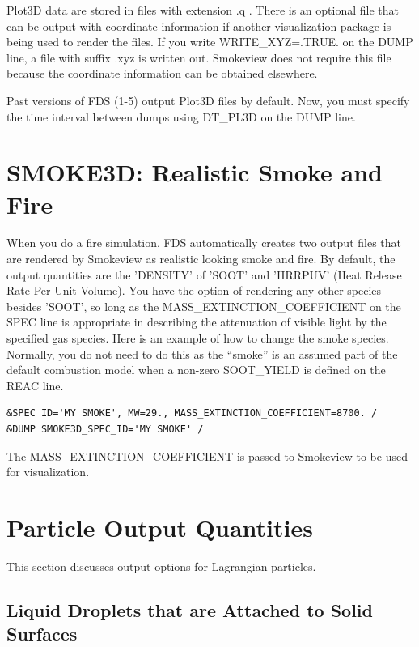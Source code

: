 \documentclass[11pt]{book}
\begin{document}
Plot3D data are stored in files with extension {\ct .q} . There is an optional file that can be output with coordinate information if another visualization package is being used to render the files. If you write {\ct WRITE\_XYZ=.TRUE.} on the {\ct DUMP} line, a file with suffix {\ct .xyz} is written out. Smokeview does not require this file because the coordinate information can be obtained elsewhere.

Past versions of FDS (1-5) output Plot3D files by default. Now, you must specify the time interval between dumps using {\ct DT\_PL3D} on the {\ct DUMP} line.



\section{SMOKE3D: Realistic Smoke and Fire}
\label{info:SMOKE3D}

When you do a fire simulation, FDS automatically creates two output files that are rendered by Smokeview as realistic looking smoke and fire. By default, the output quantities are the {\ct 'DENSITY'} of {\ct 'SOOT'} and {\ct 'HRRPUV'} (Heat Release Rate Per Unit Volume). You have the option of rendering any other species besides {\ct 'SOOT'}, so long as the {\ct MASS\_EXTINCTION\_COEFFICIENT} on the {\ct SPEC} line is appropriate in describing the attenuation of visible light by the specified gas species. Here is an example of how to change the smoke species. Normally, you do not need to do this as the ``smoke'' is an assumed part of the default combustion model when a non-zero {\ct SOOT\_YIELD} is defined on the {\ct REAC} line.
\begin{lstlisting}
&SPEC ID='MY SMOKE', MW=29., MASS_EXTINCTION_COEFFICIENT=8700. /
&DUMP SMOKE3D_SPEC_ID='MY SMOKE' /
\end{lstlisting}
The {\ct MASS\_EXTINCTION\_COEFFICIENT} is passed to Smokeview to be used for visualization.



\section{Particle Output Quantities}
\label{info:part_output}

This section discusses output options for Lagrangian particles.

\subsection{Liquid Droplets that are Attached to Solid Surfaces}
\label{bucket_test_1}
\end{document}
